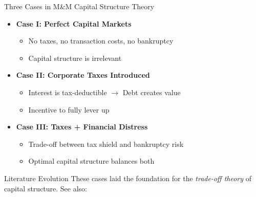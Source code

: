 \begin{frame}{Three Cases in M\&M Capital Structure Theory}
	
	\begin{itemize}
		\item \textbf{Case I: Perfect Capital Markets}
		\begin{itemize}
			\item No taxes, no transaction costs, no bankruptcy
			\item Capital structure is irrelevant
		\end{itemize}
		
		\item \textbf{Case II: Corporate Taxes Introduced}
		\begin{itemize}
			\item Interest is tax-deductible $\rightarrow$ Debt creates value
			\item Incentive to fully lever up
		\end{itemize}
		
		\item \textbf{Case III: Taxes + Financial Distress}
		\begin{itemize}
			\item Trade-off between tax shield and bankruptcy risk
			\item Optimal capital structure balances both
		\end{itemize}
	\end{itemize}
	
	\vspace{0.2cm}
	\begin{block}{Literature Evolution}
		These cases laid the foundation for the \textit{trade-off theory} of capital structure.  
		See also: \textcite{miller1988nobel}
	\end{block}
	
\end{frame}
